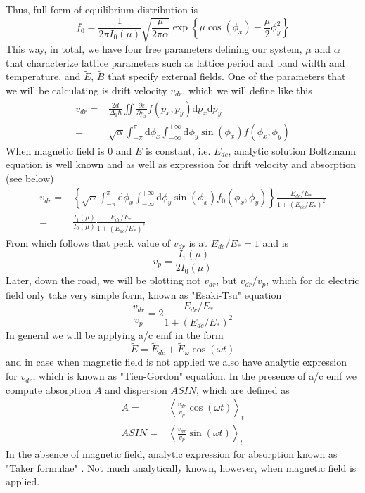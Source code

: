 \documentclass[40pt,letterpaper,physrev]{article}
\begin{document}
    Thus, full form of equilibrium distribution is
    \begin{equation}
    \boxed{
	f_0=\frac{1}{2\pi I_0(\mu)}\sqrt{\frac{\mu}{2\pi\alpha}}\exp{\left \{ \mu\cos(\phi_x)-\frac{\mu}{2}\phi^2_y\right \} } }
	\end{equation}
	This way, in total, we have four free parameters defining our system, $\mu$ and $\alpha$ that characterize lattice parameters such as lattice period and band width and temperature, and $\tilde{E}$, $\tilde{B}$ that specify external fields.
	One of the parameters that we will be calculating is drift 
	velocity $v_{dr}$, which we will define like this
	\begin{align}
		v_{dr}=&\frac{2d}{\Delta_1\hbar}\iint
			\frac{\partial\varepsilon}{\partial p_x}f(p_x,p_y)\text{d}p_x\text{d}p_y \\
			=&\sqrt{\alpha}\int^{\pi}_{-\pi}\text{d}\phi_x\int^{+\infty}_{-\infty}\text{d}\phi_y\sin(\phi_x)f(\phi_x,\phi_y)\label{eq:v_dr_generic}
	\end{align}
    When magnetic field is $0$ and $E$ is constant, i.e. $E_{dc}$, analytic 
    solution Boltzmann equation is well known and as well as expression for 
    drift velocity and absorption (see below) \cite{WAC01}
    \begin{align}
	v_{dr}=&\left \{ \sqrt{\alpha}\int^{\pi}_{-\pi}\text{d}\phi_x\int^{+\infty}_{-\infty}\text{d}\phi_y\sin(\phi_x)f_0(\phi_x,\phi_y)\right \}
	\frac{E_{dc}/E_*}{1+(E_{dc}/E_*)^2} \\
	=&\frac{I_1(\mu)}{I_0(\mu)}\frac{E_{dc}/E_*}{1+(E_{dc}/E_*)^2}
    \end{align}
	From which follows that peak value of $v_{dr}$ is at $E_{dc}/E_*=1$ and is 
	\begin{equation}
		v_p=\frac{I_1(\mu)}{2I_0(\mu)}\label{eq:v_peak}
	\end{equation}
	Later, down the road, we will be plotting not $v_{dr}$, but $v_{dr}/v_p$,
	which for dc electric field only take very simple form, known as "Esaki-Tsu" equation
	\begin{equation}
		\frac{v_{dr}}{v_p}=2\frac{E_{dc}/E_*}{1+(E_{dc}/E_*)^2}
	\end{equation}
	In general we will be applying a/c emf in the form 
	\begin{equation}
	\tilde{E}=\tilde{E}_{dc}+\tilde{E}_{\omega}\cos(\omega t)\label{eq:tilde_E_as_a_function_of_time}
	\end{equation}
	and in case when magnetic field is not applied we also have analytic expression for $v_{dr}$, which is known as "Tien-Gordon" equation. In the presence of a/c emf we compute absorption $A$ and dispersion $ASIN$, which are defined as 
	\begin{align}
	A=&\left <\frac{v_{dr}}{v_p}\cos(\omega t) \right >_{t} \\
	ASIN=&\left <\frac{v_{dr}}{v_p}\sin(\omega t) \right >_{t}
	\end{align}
    In the absence of magnetic field, analytic expression for absorption known as "Taker formulae" \cite{WAC01}. 
    Not much analytically known, however, when magnetic field is applied.
    	
\end{document}
